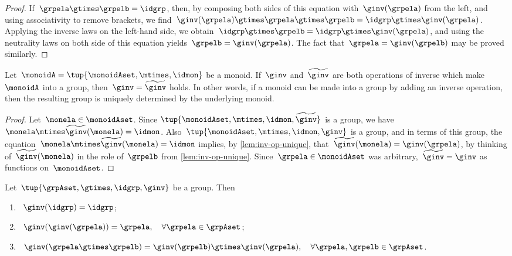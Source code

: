 \begin{proof}
    If~$\grpela \gtimes \grpelb = \idgrp$, then, by composing both sides of this equation with~$\ginv(\grpela)$ from the left, and using associativity to remove brackets, we find~$\ginv(\grpela) \gtimes \grpela \gtimes \grpelb = \idgrp \gtimes \ginv(\grpela)$.
    Applying the inverse laws on the left-hand side, we obtain~$\idgrp \gtimes \grpelb = \idgrp \gtimes \ginv(\grpela)$, and using the neutrality laws on both side of this equation yields~$\grpelb =  \ginv(\grpela)$.
    The fact that~$\grpela = \ginv(\grpelb)$ may be proved similarly.
\end{proof}


\begin{corollary}
    \label{cor:inv-op-unique}
    Let~$\monoidA = \tup{\monoidAset, \mtimes,  \idmon }$ be a monoid.
    If~$\ginv$ and~$\widetilde \ginv$ are both operations of inverse which make~$\monoidA$ into a group, then~$\ginv = \widetilde \ginv$ holds.
    In other words, if a monoid can be made into a group by adding an inverse operation, then the resulting group is uniquely determined by the underlying monoid.
\end{corollary}

\begin{proof}
    Let~$\monela \in \monoidAset$.
    Since $\tup{\monoidAset, \mtimes,  \idmon, \widetilde \ginv }$ is a group, we have~$\monela \mtimes  \widetilde \ginv(\monela) = \idmon$.
    Also~$\tup{\monoidAset, \mtimes,  \idmon, \ginv }$ is a group, and in terms of this group, the equation~$\monela \mtimes  \widetilde \ginv(\monela) = \idmon$ implies, by \cref{lem:inv-op-unique}, that~$\widetilde \ginv(\monela) = \ginv(\grpela)$, by thinking of~$\widetilde \ginv(\monela)$ in the role of~$\grpelb$ from \cref{lem:inv-op-unique}.
    Since~$\grpela \in \monoidAset$ was arbitrary,~$\widetilde \ginv = \ginv$ as functions on~$\monoidAset$.
\end{proof}


\begin{lemma}
    \label{lem:inv-op-properties}
    Let~$\tup{\grpAset, \gtimes, \idgrp, \ginv}$ be a group.
    Then
    \begin{enumerate}
        \item\label{eq:group-neutral-invariant}~$\ginv(\idgrp) = \idgrp$;
        \item\label{eq:group-inverse-inverse}~$ \ginv(\ginv(\grpela)) = \grpela, \quad \forall \grpela \in \grpAset$;
        \item\label{eq:group-inverse-of-composition}~$\ginv(\grpela \gtimes \grpelb ) = \ginv(\grpelb) \gtimes \ginv(\grpela), \quad \forall \grpela, \grpelb \in \grpAset$.
    \end{enumerate}
\end{lemma}

